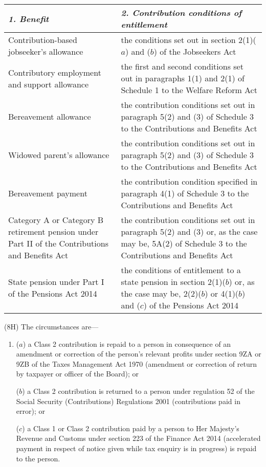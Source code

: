 \documentclass[12pt,a4paper]{article}
\begin{document}
\noindent
\begin{longtable}{p{149.14655pt}p{216.85005pt}}
\hline
\itshape 1. Benefit	&\itshape 2. Contribution conditions of entitlement\\
\hline
\endhead
\hline
\endlastfoot
Contribution-based jobseeker’s allowance	&the conditions set out in section 2(1)($a$) and ($b$) of the Jobseekers Act\\
Contributory employment and support allowance	&the first and second conditions set out in paragraphs 1(1) and 2(1) of Schedule 1 to the Welfare Reform Act\\
Bereavement allowance	&the contribution conditions set out in paragraph 5(2) and (3) of Schedule 3 to the Contributions and Benefits Act\\
Widowed parent’s allowance	&the contribution conditions set out in paragraph 5(2) and (3) of Schedule 3 to the Contributions and Benefits Act\\
Bereavement payment	&the contribution condition specified in paragraph 4(1) of Schedule 3 to the Contributions and Benefits Act\\
Category A or Category B retirement pension under Part II of the Contributions and Benefits Act	&the contribution conditions set out in paragraph 5(2) and (3) or, as the case may be, 5A(2) of Schedule 3 to the Contributions and Benefits Act\\
State pension under Part I of the Pensions Act 2014	&the conditions of entitlement to a state pension in section 2(1)($b$) or, as the case may be, 2(2)($b$) or 4(1)($b$) and ($c$) of the Pensions Act 2014\\
\end{longtable}

(8H) The circumstances are—
\begin{enumerate}\item[]
($a$) a Class 2 contribution is repaid to a person in consequence of an amendment or correction of the person’s relevant profits under section 9ZA or 9ZB of the Taxes Management Act 1970 (amendment or correction of return by taxpayer or officer of the Board); or

($b$) a Class 2 contribution is returned to a person under regulation 52 of the Social Security (Contributions) Regulations 2001 (contributions paid in error); or

($c$) a Class 1 or Class 2 contribution paid by a person to Her Majesty’s Revenue and Customs under section 223 of the Finance Act 2014 (accelerated payment in respect of notice given while tax enquiry is in progress) is repaid to the person.
\end{enumerate}
\end{document}
